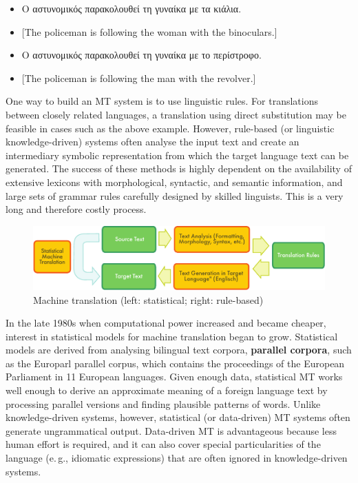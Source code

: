 \documentclass[]{../../metanetpaper}
\begin{document}
\begin{multicols}{2}
\begin{itemize}
\item Ο αστυνομικός παρακολουθεί τη γυναίκα με τα κιάλια.
\item {[}The policeman is following the woman with the binoculars.{]} 
\item Ο αστυνομικός παρακολουθεί τη γυναίκα με το περίστροφο.
\item {[}The policeman is following the man with the revolver.{]}
\end{itemize}

One way to build an MT system is to use linguistic rules. For translations between closely related languages, a translation using direct substitution may be feasible in cases such as the above example. However, rule-based (or linguistic knowledge-driven) systems often analyse the input text and create an intermediary symbolic representation from which the target language text can be generated. The success of these methods is highly dependent on the availability of extensive lexicons with morphological, syntactic, and semantic information, and large sets of grammar rules carefully designed by skilled linguists. This is a very long and therefore costly process.

\begin{figure}[htb]
  \center
  \includegraphics[width=\textwidth]{../_media/english/machine_translation}
  \caption{Machine translation (left: statistical; right: rule-based)}
  \label{fig:mtarch_en}
\end{figure}
 
In the late 1980s when computational power increased and became cheaper, interest in statistical models for machine translation began to grow. Statistical models are derived from analysing bilingual text corpora, \textbf{parallel corpora}, such as the Europarl parallel corpus, which contains the proceedings of the European Parliament in 11 European languages. Given enough data, statistical MT works well enough to derive an approximate meaning of a foreign language text by processing parallel versions and finding plausible patterns of words. Unlike knowledge-driven systems, however, statistical (or data-driven) MT systems often generate ungrammatical output. Data-driven MT is advantageous because less human effort is required, and it can also cover special particularities of the language (e.\,g., idiomatic expressions) that are often ignored in knowledge-driven systems. 


\end{multicols}
\end{document}
